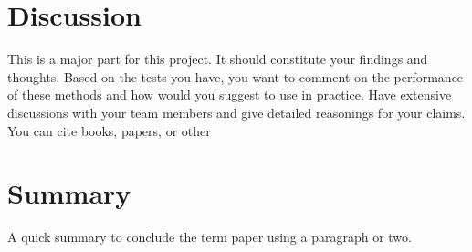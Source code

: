 \documentclass[11pt]{article}	%
\begin{document}
\section{Discussion}
This is a major part for this project. It should constitute your findings and thoughts.
Based on the tests you have,
you want to comment on the performance of these methods and how would you
suggest to use in practice. Have extensive discussions with your team members
and give detailed reasonings for your claims. You can cite books, papers, or other


\section{Summary}
A quick summary to conclude the term paper using a paragraph or two.
\end{document}
